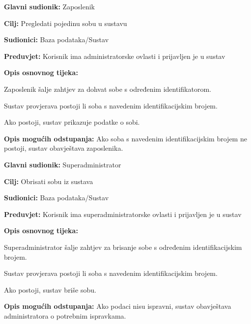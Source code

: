 \noindent {}
\begin{packed_item}
	
	\item \textbf{Glavni sudionik: }Zaposlenik
	\item  \textbf{Cilj:} Pregledati pojedinu sobu u sustavu
	\item  \textbf{Sudionici:} Baza podataka/Sustav
	\item  \textbf{Preduvjet:} Korisnik ima administratorske ovlasti i prijavljen je u sustav
	\item  \textbf{Opis osnovnog tijeka:}
	
	\item[] \begin{packed_enum}
		
		\item Zaposlenik šalje zahtjev za dohvat sobe  s određenim identifikatorom.
		\item Sustav provjerava postoji li soba s navedenim identifikacijskim brojem.
		\item Ako postoji, sustav prikazuje podatke o sobi.
		
	\end{packed_enum}
	
	\item  \textbf{Opis mogućih odstupanja:} Ako soba s navedenim identifikacijskim brojem ne postoji, sustav obavještava zaposlenika.
	
	
\end{packed_item}

\noindent {}
\begin{packed_item}
	
	\item \textbf{Glavni sudionik: }Superadministrator
	\item  \textbf{Cilj:} Obrisati sobu iz sustava
	\item  \textbf{Sudionici:} Baza podataka/Sustav
	\item  \textbf{Preduvjet:} Korisnik ima superadministratorske ovlasti i prijavljen je u sustav
	\item  \textbf{Opis osnovnog tijeka:}
	
	\item[] \begin{packed_enum}
		
		\item Superadministrator šalje zahtjev za brisanje sobe s određenim identifikacijskim brojem.
		\item Sustav provjerava postoji li soba s navedenim identifikacijskim brojem.
		\item Ako postoji, sustav briše sobu.
		
	\end{packed_enum}
	
	\item  \textbf{Opis mogućih odstupanja:} Ako podaci nisu ispravni, sustav obavještava administratora o potrebnim ispravkama.
	
	
\end{packed_item}

